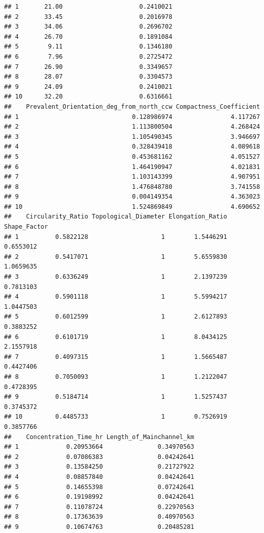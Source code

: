\documentclass[11pt,]{article}
\begin{document}
\begin{verbatim}
## 1       21.00                     0.2410021
## 2       33.45                     0.2016978
## 3       34.06                     0.2696702
## 4       26.70                     0.1891084
## 5        9.11                     0.1346180
## 6        7.96                     0.2725472
## 7       26.90                     0.3349657
## 8       28.07                     0.3304573
## 9       24.09                     0.2410021
## 10      32.20                     0.6316661
##    Prevalent_Orientation_deg_from_north_ccw Compactness_Coefficient
## 1                               0.128986974                4.117267
## 2                               1.113800504                4.268424
## 3                               1.105490345                3.946697
## 4                               0.328439418                4.089618
## 5                               0.453681162                4.051527
## 6                               1.464190947                4.021831
## 7                               1.103143399                4.907951
## 8                               1.476848780                3.741558
## 9                               0.004149354                4.363023
## 10                              1.524869849                4.690652
##    Circularity_Ratio Topological_Diameter Elongation_Ratio Shape_Factor
## 1          0.5822128                    1        1.5446291    0.6553012
## 2          0.5417071                    1        5.6559830    1.0659635
## 3          0.6336249                    1        2.1397239    0.7813103
## 4          0.5901118                    1        5.5994217    1.0447503
## 5          0.6012599                    1        2.6127893    0.3883252
## 6          0.6101719                    1        8.0434125    2.1557918
## 7          0.4097315                    1        1.5665487    0.4427406
## 8          0.7050093                    1        1.2122047    0.4728395
## 9          0.5184714                    1        1.5257437    0.3745372
## 10         0.4485733                    1        0.7526919    0.3857766
##    Concentration_Time_hr Length_of_Mainchannel_km
## 1             0.20953664               0.34970563
## 2             0.07086383               0.04242641
## 3             0.13584250               0.21727922
## 4             0.08857840               0.04242641
## 5             0.14655398               0.07242641
## 6             0.19198992               0.04242641
## 7             0.11078724               0.22970563
## 8             0.17363639               0.40970563
## 9             0.10674763               0.20485281

\end{verbatim}
\end{document}
